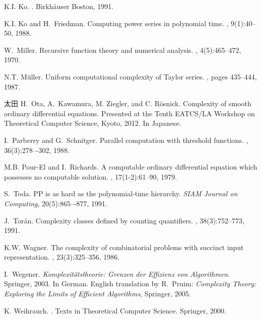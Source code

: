 \documentclass{lmcs}
\theoremstyle{definition}
\theoremstyle{remark}
\begin{document}
\begin{thebibliography}{10}
K.I. Ko.
.
\newblock Birkh{\"a}user Boston, 1991.

K.I. Ko and H.~Friedman.
\newblock Computing power series in polynomial time.
, 9(1):40--50, 1988.

W.~Miller.
\newblock Recursive function theory and numerical analysis.
, 4(5):465--472, 1970.

N.T. M{\"u}ller.
\newblock Uniform computational complexity of {T}aylor series.
, pages 435--444, 1987.

太田
H.~Ota, A.~Kawamura, M. Ziegler, and C. R{\"o}snick. 
\newblock Complexity of smooth ordinary differential equations. 
\newblock Presented at the 
Tenth EATCS/LA Workshop on Theoretical Computer Science, Kyoto, 2012. 
\newblock In Japanese. 

I.~Parberry and G.~Schnitger. 
\newblock Parallel computation with threshold functions. 
, 36(3):278–-302, 1988. 

M.B. Pour-El and I.~Richards.
\newblock A computable ordinary differential equation which possesses no
  computable solution.
, 17(1-2):61--90, 1979.

S.~Toda. 
\newblock PP is as hard as the polynomial-time hierarchy. 
\newblock \emph{SIAM Journal on Computing}, 20(5):865–-877, 1991.


J.~Tor{\'a}n.
\newblock Complexity classes defined by counting quantifiers.
, 38(3):752--773, 1991.

K.W. Wagner.
\newblock The complexity of combinatorial problems with succinct input
  representation.
, 23(3):325--356, 1986.

I.~Wegener. 
\newblock \emph{Komplexit\"atstheorie: Grenzen der Effizienz von Algorithmen}. 
\newblock Springer, 2003. 
\newblock In German.
\newblock English translation by R.~Pruim: 
\emph{Complexity Theory: Exploring the Limits of Efficient Algorithms}, Springer, 2005. 

K. Weihrauch.
.
\newblock Texts in Theoretical Computer Science. Springer, 2000.
\end{thebibliography}
\end{document}
